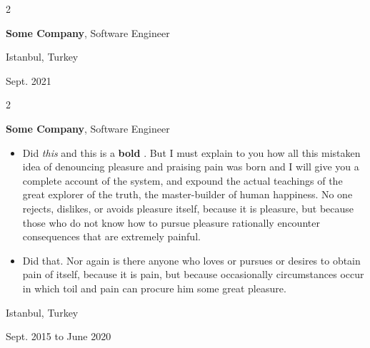 \documentclass[10pt, letterpaper]{article}
\newenvironment{highlights}{
    \begin{itemize}[
        topsep=0.10 cm,
        parsep=0.10 cm,
        partopsep=0pt,
        itemsep=0pt,
        leftmargin=0.4 cm + 10pt
    ]
}{
    \end{itemize}
} %
\newenvironment{twocolentry}[2][]{
    \onecolentry
    \def\secondColumn{#2}
    \setcolumnwidth{\fill, 4.5 cm}
    \begin{paracol}{2}
}{
    \switchcolumn \raggedleft \secondColumn
    \end{paracol}
    \endonecolentry
} %
\let\hrefWithoutArrow\href
\renewcommand{\href}[2]{\hrefWithoutArrow{#1}{\mbox{\ifthenelse{\equal{#2}{}}{ }{#2 }\raisebox{.15ex}{\footnotesize \faExternalLink*}}}}
\begin{document}
        \vspace{0.2 cm}

        \begin{twocolentry}{
            Istanbul, Turkey

        Sept. 2021
        }
            \textbf{Some \textnormal{Company}}, Software Engineer
        \end{twocolentry}


        \vspace{0.2 cm}

        \begin{twocolentry}{
            Istanbul, Turkey

        Sept. 2015 to June 2020
        }
            \textbf{Some \textnormal{Company}}, Software Engineer
            \begin{highlights}
                \item Did \textit{this} and this is a \textbf{bold} \href{https://example.com}{link}. But I must explain to you how all this mistaken idea of denouncing pleasure and praising pain was born and I will give you a complete account of the system, and expound the actual teachings of the great explorer of the truth, the master-builder of human happiness. No one rejects, dislikes, or avoids pleasure itself, because it is pleasure, but because those who do not know how to pursue pleasure rationally encounter consequences that are extremely painful.
                \item Did that. Nor again is there anyone who loves or pursues or desires to obtain pain of itself, because it is pain, but because occasionally circumstances occur in which toil and pain can procure him some great pleasure.
            \end{highlights}
        \end{twocolentry}


        \vspace{0.2 cm}
\end{document}
